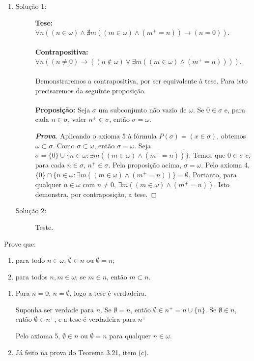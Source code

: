 \begin{enumerate}[label=(\alph{*})]
	\item  
	\begin{description}
		\item[Solução 1:] \textbf{Tese:} \\
		$\forall n((n\in\omega)\wedge\nexists m((m\in\omega)\wedge(m^+=n))\to(n=0))$. \\ \\
		\textbf{Contrapositiva:} \\
		$\forall n((n\neq0)\to((n\notin\omega)\vee\exists m((m\in\omega)\wedge(m^+=n))))$. \\ \\
		Demonstraremos a contrapositiva, por ser equivalente à tese. Para isto precisaremos da seguinte proposição. \\ \\
		\textbf{Proposição:} Seja $\sigma$ um subconjunto não vazio de $\omega$. Se $0\in\sigma$ e, para cada $n\in\sigma$, valer $n^+\in\sigma$, então $\sigma=\omega$.
		\begin{proof}[\textbf{Prova}]
			Aplicando o axioma 5 à fórmula $P(\sigma)=(x\in\sigma)$, obtemos $\omega\subset \sigma$. Como $\sigma\subset \omega$, então $\sigma=\omega$. Seja $ \sigma=\{0\}\cup\{n\in\omega:\exists m((m\in\omega)\wedge(m^+=n))\} $. Temos que $ 0\in\sigma $ e, para cada $ n\in\sigma $, $ n^+\in\sigma $. Pela proposição acima, $ \sigma=\omega $. Pelo axioma 4, $ \{0\}\cap\{n\in\omega:\exists m((m\in\omega)\wedge(m^+=n))\}=\emptyset $. Portanto, para qualquer $ n\in\omega $ com $ n\neq0 $, $\exists m((m\in\omega)\wedge(m^+=n)) $. Isto demonstra, por contraposição, a tese.
		\end{proof}
		
		\item[Solução 2:]
		Teste.
	\end{description}	
	
	
\end{enumerate}


\begin{exercicio}
	Prove que:
	\begin{enumerate}[label=(\alph{*})]
		\item para todo $n\in\omega$, $\emptyset\in n$ ou $\emptyset=n$;
		\item para todos $n,m\in\omega$, se $m\in n$, então $m\subset n$.
	\end{enumerate}
\end{exercicio}

\begin{enumerate}[label=(\alph{*})]
	\item Para $n=0$, $n=\emptyset$, logo a tese é verdadeira.
	
	Suponha ser verdade para $n$. Se $\emptyset=n$, então $\emptyset\in n^+=n\cup\{n\}$. Se $\emptyset\in n$, então $\emptyset\in n^+$, e a tese é verdadeira para $n^+$
	
	Pelo axioma 5, $\emptyset\in n$ ou $\emptyset=n$ para qualquer $n\in\omega$.
	\item Já feito na prova do Teorema 3.21, item (c).
\end{enumerate}


